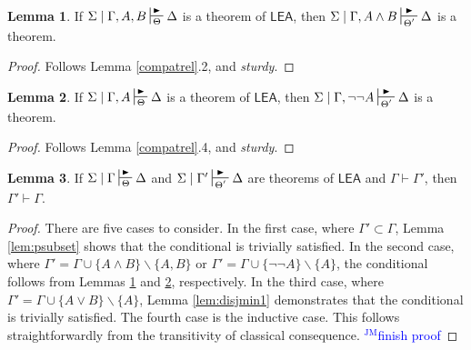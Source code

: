 \documentclass{article}
\theoremstyle{definition}
\theoremstyle{definition}
\theoremstyle{definition}
\newtheorem{lemma}{Lemma}
\theoremstyle{definition}
\theoremstyle{remark}
\theoremstyle{definition}
\theoremstyle{definition}
\newcommand{\jm}[1]{\textcolor{blue}{$^{\textrm{JM}}${#1}}}
\begin{document}
\begin{lemma}\label{lem:wedgemin}
	If $ \Sigma\mid\Gamma, A, B\sststile{\Theta}{\RHD}\Delta $ is a theorem of $ \mathsf{LEA}$, then $ \Sigma\mid\Gamma, A\wedge B\sststile{\Theta'}{\RHD}\Delta $  is a theorem.
	\begin{proof}
		Follows Lemma \ref{compatrel}.2, and \textit{sturdy}.
	\end{proof}
\end{lemma}

\begin{lemma}\label{lem:negmin}
	If $ \Sigma\mid\Gamma, A\sststile{\Theta}{\RHD}\Delta $ is a theorem of $ \mathsf{LEA}$, then $ \Sigma\mid\Gamma, \neg\neg A\sststile{\Theta'}{\RHD}\Delta $  is a theorem.
	\begin{proof}
		Follows Lemma \ref{compatrel}.4, and \textit{sturdy}.
	\end{proof}
\end{lemma}

\begin{lemma}\label{lem:minimality}
		If $ \Sigma\mid\Gamma\sststile{\Theta}{\RHD}\Delta $ and $ \Sigma\mid\Gamma'\sststile{\Theta'}{\RHD}\Delta $ are theorems of $ \mathsf{LEA}$ and $\Gamma \vdash \Gamma' $, then $ \Gamma' \vdash \Gamma $.
		\begin{proof}
			There are five cases to consider. In the first case, where $ \Gamma' \subset \Gamma $, Lemma \ref{lem:psubset} shows that the conditional is trivially satisfied. In the second case, where $ \Gamma'=\Gamma\cup\{A\wedge B\} \backslash \{A, B\} $ or $ \Gamma'=\Gamma\cup\{\neg\neg A\} \backslash \{A\} $, the conditional follows from Lemmas \ref{lem:wedgemin} and \ref{lem:negmin}, respectively. In the third case, where  $ \Gamma'=\Gamma\cup\{A\vee B\}\backslash\{A\} $, Lemma \ref{lem:disjmin1} demonstrates that the conditional is trivially satisfied. The fourth case is the inductive case. This follows straightforwardly from the transitivity of classical consequence. \jm{finish proof}
		\end{proof}
\end{lemma}
\end{document}
